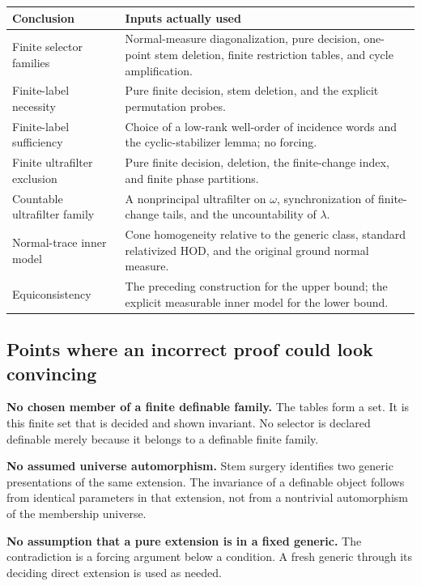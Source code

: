 \documentclass[11pt,letterpaper]{article}
\theoremstyle{definition}
\numberwithin{equation}{section}
\begin{document}
\begin{center}
\small
\renewcommand{\arraystretch}{1.2}
\begin{tabularx}{\textwidth}{@{}P{.27\textwidth}Y@{}}
\toprule
\textbf{Conclusion}&\textbf{Inputs actually used}\\\midrule
Finite selector families&Normal-measure diagonalization, pure decision, one-point stem deletion, finite restriction tables, and cycle amplification.\\
Finite-label necessity&Pure finite decision, stem deletion, and the explicit permutation probes.\\
Finite-label sufficiency&Choice of a low-rank well-order of incidence words and the cyclic-stabilizer lemma; no forcing.\\
Finite ultrafilter exclusion&Pure finite decision, deletion, the finite-change index, and finite phase partitions.\\
Countable ultrafilter family&A nonprincipal ultrafilter on $\omega$, synchronization of finite-change tails, and the uncountability of $\lambda$.\\
Normal-trace inner model&Cone homogeneity relative to the generic class, standard relativized HOD, and the original ground normal measure.\\
Equiconsistency&The preceding construction for the upper bound; the explicit measurable inner model for the lower bound.\\
\bottomrule
\end{tabularx}
\end{center}

\subsection{Points where an incorrect proof could look convincing}

\textbf{No chosen member of a finite definable family.}
The tables form a set. It is this finite set that is decided and shown invariant. No selector is declared definable merely because it belongs to a definable finite family.

\textbf{No assumed universe automorphism.}
Stem surgery identifies two generic presentations of the same extension. The invariance of a definable object follows from identical parameters in that extension, not from a nontrivial automorphism of the membership universe.

\textbf{No assumption that a pure extension is in a fixed generic.}
The contradiction is a forcing argument below a condition. A fresh generic through its deciding direct extension is used as needed.
\end{document}
